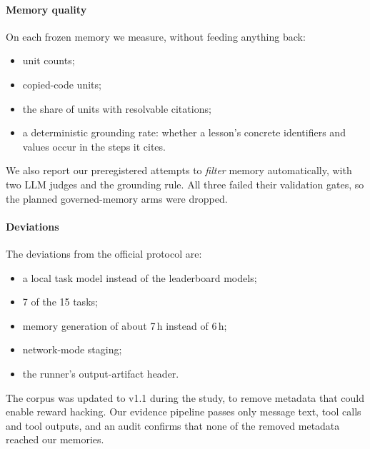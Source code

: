 \paragraph{Memory quality}
On each frozen memory we measure, without feeding anything back:
\begin{itemize}
  \item unit counts;
  \item copied-code units;
  \item the share of units with resolvable citations;
  \item a deterministic grounding rate: whether a lesson's concrete identifiers and values occur in the steps it cites.
\end{itemize}
We also report our preregistered attempts to \emph{filter} memory automatically, with two LLM judges and the grounding rule.
All three failed their validation gates, so the planned governed-memory arms were dropped.

\paragraph{Deviations}
The deviations from the official protocol are:
\begin{itemize}
  \item a local task model instead of the leaderboard models;
  \item 7 of the 15 tasks;
  \item memory generation of about 7\,h instead of 6\,h;
  \item network-mode staging;
  \item the runner's output-artifact header.
\end{itemize}
The corpus was updated to v1.1 during the study, to remove metadata that could enable reward hacking. Our evidence pipeline passes only message text, tool calls and tool outputs, and an audit confirms that none of the removed metadata reached our memories.
